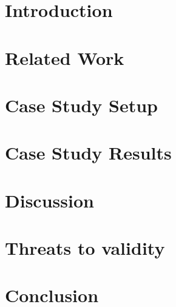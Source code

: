 \documentclass[10pt, conference]{IEEEtran}
\begin{document}
\begin{abstract}
		
		
		
	
	\end{abstract}
	

\section{Introduction}
\label{sec:introduction}


\section{Related Work}
\label{sec:related_work}


\section{Case Study Setup}
\label{sec:case_study_setup}


\section{Case Study Results}
\label{sec:results}


\section{Discussion}
\label{sec:discussion}


\section{Threats to validity}
\label{sec:threats_to_validity}


\section{Conclusion}
\label{sec:conclusion}




\end{document}
